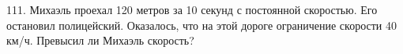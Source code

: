 111. Михаэль проехал 120 метров за 10 секунд с постоянной скоростью. Его остановил полицейский. Оказалось, что на этой дороге ограничение скорости 40 км/ч. Превысил ли Михаэль скорость?\\
